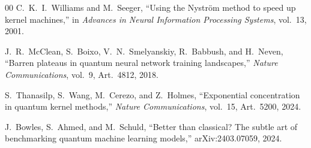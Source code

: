 \documentclass[10pt,a4paper]{article}
\begin{document}
\begin{thebibliography}{00}
C.~K.~I.~Williams and M.~Seeger,
``Using the Nystr\"om method to speed up kernel machines,''
in \textit{Advances in Neural Information Processing Systems}, vol.~13, 2001.

J.~R.~McClean, S.~Boixo, V.~N.~Smelyanskiy, R.~Babbush, and H.~Neven,
``Barren plateaus in quantum neural network training landscapes,''
\textit{Nature Communications}, vol.~9, Art.~4812, 2018.

S.~Thanasilp, S.~Wang, M.~Cerezo, and Z.~Holmes,
``Exponential concentration in quantum kernel methods,''
\textit{Nature Communications}, vol.~15, Art.~5200, 2024.

J.~Bowles, S.~Ahmed, and M.~Schuld,
``Better than classical? The subtle art of benchmarking quantum machine learning models,''
arXiv:2403.07059, 2024.
\end{thebibliography}\endgroup
\end{document}
